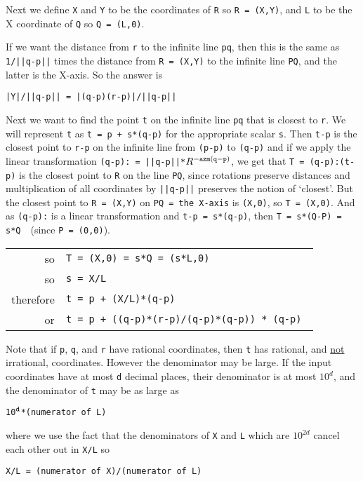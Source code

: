 \documentclass[12pt]{article}
\begin{document}
Next we define {\tt X} and {\tt Y} to be the coordinates of {\tt R}
so {\tt R = (X,Y)}, and {\tt L} to be the X coordinate of {\tt Q}
so {\tt Q = (L,0)}.

If\label{DISTANCE-OF-LINE-TO-POINT}
we want the distance from {\tt r} to the infinite line {\tt pq},
then this is the same as {\tt 1/||q-p||} times
the distance from {\tt R = (X,Y)} to the infinite
line {\tt PQ}, and the latter is the X-axis.  So the answer is \\
\centerline{\tt |Y|/||q-p|| = |(q-p)\WH(r-p)|/||q-p||}

Next we want to find the point {\tt t} on the infinite line {\tt pq}
that is closest to {\tt r}.  We will represent {\tt t} as {\tt t = p + s*(q-p)}
for the appropriate scalar {\tt s}.  Then {\tt t-p} is the closest point to
{\tt r-p} on the infinite line from {\tt (p-p)} to {\tt (q-p)}
and if we apply the
linear transformation {\tt (q-p):~= ||q-p||*$R^{\tt -azm (q-p)}$},
we get that {\tt T = (q-p):(t-p)} is the closest point to {\tt R} on the
line {\tt PQ}, since rotations preserve distances and multiplication
of all coordinates by {\tt ||q-p||} preserves the notion of `closest'.
But the closest point to {\tt R = (X,Y)} on {\tt PQ = {\rm the X-axis}}
is {\tt (X,0)}, so {\tt T = (X,0)}.
And as {\tt (q-p):} is a linear transformation and {\tt t-p = s*(q-p)},
then {\tt T = s*(Q-P) = s*Q}~~(since {\tt P = (0,0)}).

\hspace*{0.3in}\begin{tabular}{rl}
so	& \tt T = (X,0) = s*Q = (s*L,0) \\
so	& \tt s = X/L \\
therefore     & \tt t = p + (X/L)*(q-p) \\
or	& \tt t = p + ((q-p)*(r-p)/(q-p)*(q-p)) * (q-p) \\
\end{tabular}

Note that if {\tt p}, {\tt q}, and {\tt r} have rational coordinates,
then {\tt t} has rational\label{CLOSEST-IS-RATIONAL},
and \underline{not} irrational,
coordinates.  However the denominator may be large.  If
the input coordinates have at most {\tt d} decimal places,
their denominator is at most $10^d$, and the denominator of {\tt t}
may be as large as \\
\centerline{\tt 10$^{\tt d}$*({\rm numerator of} L)}
where we use the fact that the denominators of {\tt X} and {\tt L}
which are $10^{2d}$ cancel each other out in {\tt X/L} so \\
\centerline{\tt X/L = ({\rm numerator of} X)/({\rm numerator of} L)}
\end{document}
